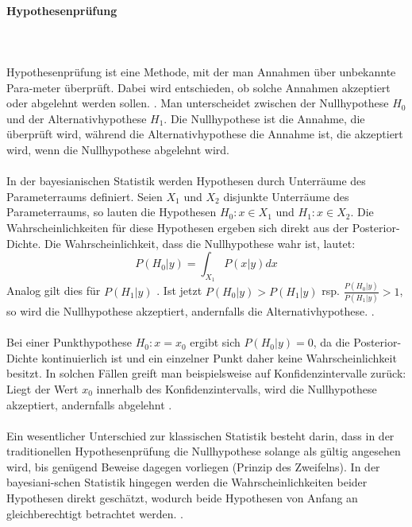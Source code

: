 \documentclass[a4paper,12pt]{article}
\begin{document}
\newpage
\paragraph{Hypothesenprüfung} \mbox{}\\\\
Hypothesenprüfung ist eine Methode, mit der man Annahmen über unbekannte Para-meter überprüft. Dabei wird entschieden, ob solche Annahmen akzeptiert oder abgelehnt werden sollen. \parencite[74]{EinfBayesStatistik}. Man unterscheidet zwischen der Nullhypothese $H_0$ und der Alternativhypothese $H_1$. Die Nullhypothese ist die Annahme, die überprüft wird, während die Alternativhypothese die Annahme ist, die akzeptiert wird, wenn die Nullhypothese abgelehnt wird. \\\\
In der bayesianischen Statistik werden Hypothesen durch Unterräume des Parameterraums definiert. Seien $X_1$ und $X_2$ disjunkte Unterräume des Parameterraums, so lauten die Hypothesen $H_0: x \in X_1$ und $H_1: x \in X_2$. Die Wahrscheinlichkeiten für diese Hypothesen ergeben sich direkt aus der Posterior-Dichte. Die Wahrscheinlichkeit, dass die Nullhypothese wahr ist, lautet:
\begin{equation}
  P(H_0|y) = \int_{X_1} P(x|y) dx
\end{equation}
Analog gilt dies für $P(H_1|y)$ \parencite[74]{EinfBayesStatistik}. Ist jetzt $P(H_0|y) > P(H_1|y)$ rsp. $\frac{P(H_0|y)}{P(H_1|y)}>1$, so wird die Nullhypothese akzeptiert, andernfalls die Alternativhypothese. \parencite[77]{EinfBayesStatistik}. \\\\
Bei einer Punkthypothese $H_0: x = x_0$ ergibt sich $P(H_0|y) = 0$, da die Posterior-Dichte kontinuierlich ist und ein einzelner Punkt daher keine Wahrscheinlichkeit besitzt. In solchen Fällen greift man beispielsweise auf Konfidenzintervalle zurück: Liegt der Wert $x_0$ innerhalb des Konfidenzintervalls, wird die Nullhypothese akzeptiert, andernfalls abgelehnt \parencite[84]{EinfBayesStatistik}. \\\\
Ein wesentlicher Unterschied zur klassischen Statistik besteht darin, dass in der traditionellen Hypothesenprüfung die Nullhypothese solange als gültig angesehen wird, bis genügend Beweise dagegen vorliegen (Prinzip des Zweifelns). In der bayesiani-schen Statistik hingegen werden die Wahrscheinlichkeiten beider Hypothesen direkt geschätzt, wodurch beide Hypothesen von Anfang an gleichberechtigt betrachtet werden. \parencite[83]{EinfBayesStatistik}.
\end{document}
